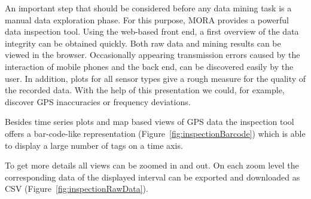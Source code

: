 \documentclass[times, 10pt,twocolumn]{article}
\begin{document}

An important step that should be considered before any data mining task is a manual data exploration phase.
For this purpose, MORA provides a powerful data inspection tool.
Using the web-based front end, a first overview of the data integrity can be obtained quickly.
Both raw data and mining results can be viewed in the browser.
Occasionally appearing transmission errors caused by the interaction of mobile phones and the back end, can be discovered easily by the user.
In addition, plots for all sensor types give a rough measure for the quality of the recorded data.
With the help of this presentation we could, for example, discover GPS inaccuracies or frequency deviations.

Besides time series plots and map based views of GPS data the inspection tool offers a bar-code-like representation (Figure~\ref{fig:inspectionBarcode}) which is able to display a large number of tags on a time axis.

To get more details all views can be zoomed in and out.
On each zoom level the corresponding data of the displayed interval can be exported and downloaded as CSV (Figure~\ref{fig:inspectionRawData}).
\end{document}
